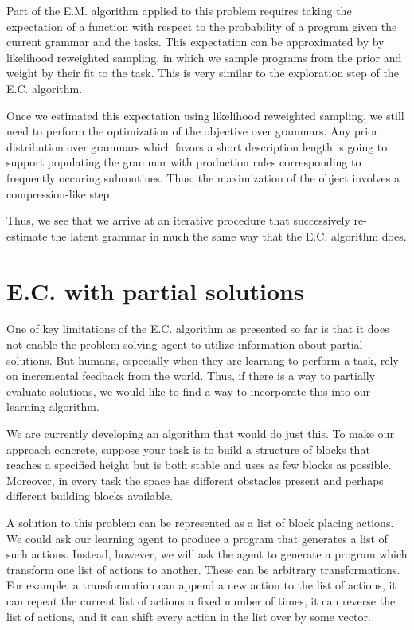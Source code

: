\documentclass{article}
\begin{document}
Part of the E.M. algorithm applied to this problem
requires taking the expectation of a function with respect to the
probability of a program given the current grammar and the tasks. This
expectation can be approximated by by likelihood reweighted sampling,
in which we sample programs from the prior and weight by their fit to
the task. This is very similar to the exploration step of the
E.C. algorithm. 

Once we estimated this expectation using likelihood reweighted
sampling, we still need to perform the optimization of the objective
over grammars. Any prior distribution over grammars which favors a
short description length is going to support populating the grammar
with production rules corresponding to frequently occuring
subroutines. Thus, the maximization of the object involves a
compression-like step.

Thus, we see that we arrive at an iterative procedure that
successively re-estimate the latent grammar in much the same way that
the E.C. algorithm does. 

\section{E.C. with partial solutions}

One of key limitations of the E.C. algorithm as presented so far is
that it does not enable the problem solving agent to utilize
information about partial solutions. But humans, especially when they
are learning to perform a task, rely on incremental feedback from the
world. Thus, if there is a way to partially evaluate solutions, we
would like to find a way to incorporate this into our learning
algorithm. 

We are currently developing an algorithm that would do just this. To
make our approach concrete, suppose your task is to build a structure
of blocks that reaches a specified height but is both stable and uses
as few blocks as possible. Moreover, in every task the space has
different obstacles present and perhaps different building blocks
available.

A solution to this problem can be represented as a list of block
placing actions. We could ask our learning agent to produce a program
that generates a list of such actions. Instead, however, we will ask
the agent to generate a program which transform one list of actions
to another. These can be arbitrary transformations. For example, a
transformation can append a new action to the list of actions, it can
repeat the current list of actions a fixed number of times, it can
reverse the list of actions, and it can shift every action in the list
over by some vector. 
\end{document}
